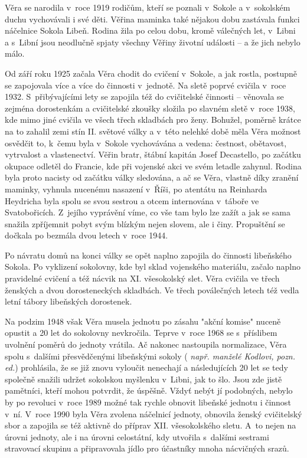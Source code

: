 \documentclass[a5paper, 11pt, twoside]{article}
\newcommand{\pozned}[1]{%
\textit{#1}}
\begin{document}
Věra se narodila v~roce 1919 rodičům, kteří se poznali v~Sokole a
v~sokolském duchu vychovávali i své děti. Věřina maminka také nějakou dobu
zastávala funkci náčelnice Sokola Libeň. Rodina žila po celou dobu,
kromě válečných let, v~Libni a s~Libní jsou neodlučně spjaty všechny
Věřiny životní události -- a že jich nebylo málo.

Od září roku 1925 začala Věra chodit do cvičení v~Sokole, a jak rostla,
postupně se zapojovala více a více do činnosti v~jednotě. Na sletě
poprvé cvičila v~roce 1932. S~přibývajícími lety se zapojila též do
cvičitelské činnosti -- věnovala se zejména dorostenkám a cvičitelské
zkoušky složila po slavném sletě v~roce 1938, kde mimo jiné cvičila ve
všech třech skladbách pro ženy. Bohužel, poměrně krátce na to zahalil
zemi stín II. světové války a v~této nelehké době měla Věra možnost
osvědčit to, k~čemu byla v~Sokole vychovávána a vedena: čestnost,
obětavost, vytrvalost a vlastenectví. Věřin bratr, štábní kapitán Josef
Decastello, po začátku okupace odletěl do Francie, kde při vojenské akci
ve svém letadle zahynul. Rodina byla proto nacisty od začátku války
sledována, a ač se Věra, vlastně díky zranění maminky, vyhnula nucenému
nasazení v~Říši, po atentátu na Reinharda Heydricha byla spolu se svou
sestrou a otcem internována v~táboře ve Svatobořicích. Z~jejího
vyprávění víme, co vše tam bylo lze zažít a jak se sama snažila
zpříjemnit pobyt svým blízkým nejen slovem, ale i činy. Propuštění se
dočkala po bezmála dvou letech v~roce 1944.

Po návratu domů na konci války se opět naplno zapojila do činnosti
libeňského Sokola. Po vyklizení sokolovny, kde byl sklad vojenského
materiálu, začalo naplno pravidelné cvičení a též nácvik na XI.
všesokolský slet. Věra cvičila ve třech ženských a dvou dorosteneckých
skladbách. Ve třech poválečných letech též vedla letní tábory libeňských
dorostenek.

Na podzim 1948 však Věra musela jednotu po zásahu "akční komise" nuceně
opustit a 20 let do sokolovny nevkročila. Teprve v~roce 1968 se
s~příslibem uvolnění poměrů do jednoty vrátila. Ač nakonec nastoupila
normalizace, Věra spolu s~dalšími přesvědčenými libeňskými sokoly
(\pozned{např. manželé Kodlovi, pozn. ed.}) prohlásila, že se již znovu
vyloučit nenechají a následujících 20 let se tedy společně snažili
udržet sokolskou myšlenku v~Libni, jak to šlo. Jsou zde jistě pamětníci,
kteří mohou potvrdit, že úspěšně. Vždyť nebýt jí podobných, nebylo by po
revoluci v~roce 1989 možné tak rychle obnovit libeňské jednotu i činnost
v~ní. V~roce 1990 byla Věra zvolena náčelnicí jednoty, obnovila ženský
cvičitelský sbor a zapojila se též aktivně do příprav XII. všesokolského
sletu. A~to nejen na úrovni jednoty, ale i na úrovni celostátní, kdy
utvořila s~dalšími sestrami stravovací skupinu a připravovala jídlo pro
účastníky mnoha nácvičných srazů.
\end{document}
